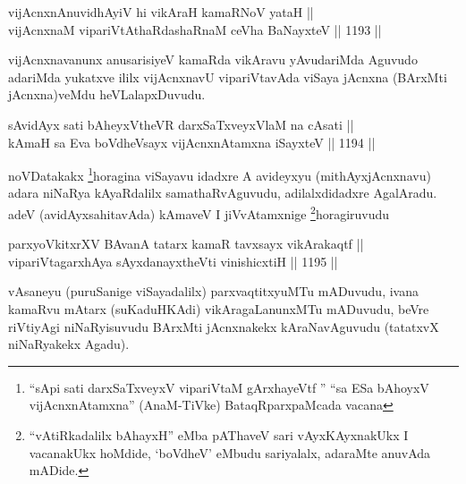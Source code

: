\begin{shl}
vijAcnxnAnuvidhAyiV hi vikAraH kamaRNoV yataH || \\
\footnotemark[1]vijAcnxnaM vipariVtAthaRdashaRnaM ceVha BaNayxteV ||  1193 ||  
\end{shl}

\begin{artha}
vijAcnxnavanunx anusarisiyeV kamaRda vikAravu yAvudariMda Aguvudo adariMda yukatxve ililx vijAcnxnavU vipariVtavAda viSaya jAcnxna (BArxMti jAcnxna)veMdu heVLalapxDuvudu.
\end{artha}

\begin{shl}
sA\s vidAyx sati bAheyxV\s theVR darxSaTxveyxV\s laM na cAsati || \\
kAmaH sa Eva boVdheV\s sayx vijAcnxnAtamxna iSayxteV ||  1194 ||  
\end{shl}

\begin{artha}
noVDatakakx \footnote{``sA\s pi sati darxSaTxveyxV vipariVtaM gArxhayeVtf '' ``sa ESa bAhoyxV vijAcnxnAtamxna'' (AnaM-TiVke) BataqRparxpaMcada vacana}horagina viSayavu idadxre A avideyxyu (mithAyxjAcnxnavu) adara niNaRya kAyaRdalilx samathaRvAguvudu, adilalxdidadxre AgalAradu. adeV (avidAyxsahitavAda) kAmaveV I jiVvAtamxnige \footnote{``vAtiRkadalilx bAhayxH'' eMba pAThaveV sari vAyxKAyxnakUkx I vacanakUkx hoMdide, `boVdheV' eMbudu sariyalalx, adaraMte anuvAda mADide.}horagiruvudu
\end{artha}

\begin{shl}
\footnotemark[2]parxyoVkitxrXV BAvanA tatarx kamaR tavxsayx vikArakaqtf || \\
vipariVtagarxhAya sAyxdanayxtheVti vinishicxtiH || 1195 ||
\end{shl}

\begin{artha}
vAsaneyu (puruSanige viSayadalilx) parxvaqtitxyuMTu mADuvudu, ivana kamaRvu mAtarx (suKaduHKAdi) vikAragaLanunxMTu mADuvudu, beVre riVtiyAgi niNaRyisuvudu BArxMti jAcnxnakekx kAraNavAguvudu (tatatxvX niNaRyakekx Agadu).
\end{artha}

